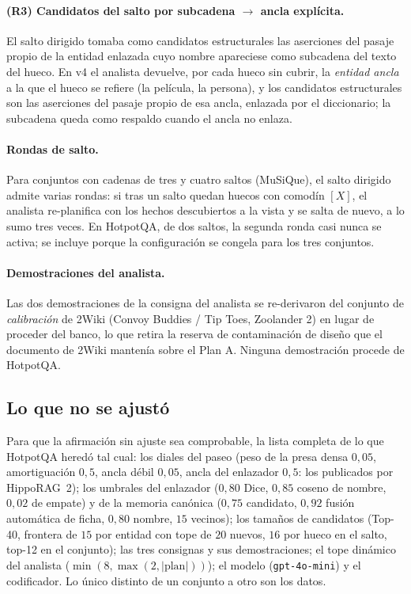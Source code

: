 \documentclass[11pt,a4paper]{article}
\newcommand{\hippo}{HippoRAG~2}
\newcommand{\gl}{\guillemotleft}
\newcommand{\gr}{\guillemotright}
\begin{document}
\paragraph{(R3) Candidatos del salto por subcadena $\to$ ancla explícita.}
El salto dirigido tomaba como candidatos estructurales las aserciones del
pasaje propio de la entidad enlazada cuyo nombre apareciese como subcadena
del texto del hueco. En v4 el analista devuelve, por cada hueco sin cubrir,
la \emph{entidad ancla} a la que el hueco se refiere (la película, la
persona), y los candidatos estructurales son las aserciones del pasaje propio
de esa ancla, enlazada por el diccionario; la subcadena queda como respaldo
cuando el ancla no enlaza.

\paragraph{Rondas de salto.}
Para conjuntos con cadenas de tres y cuatro saltos (MuSiQue), el salto
dirigido admite varias rondas: si tras un salto quedan huecos con comodín
$[X]$, el analista re-planifica con los hechos descubiertos a la vista y se
salta de nuevo, a lo sumo tres veces. En HotpotQA, de dos saltos, la
segunda ronda casi nunca se activa; se incluye porque la configuración se
congela para los tres conjuntos.

\paragraph{Demostraciones del analista.}
Las dos demostraciones de la consigna del analista se re-derivaron del
conjunto de \emph{calibración} de 2Wiki (\gl{}Convoy Buddies / Tip Toes\gr{},
\gl{}Zoolander 2\gr{}) en lugar de proceder del banco, lo que retira la
reserva de contaminación de diseño que el documento de 2Wiki mantenía sobre
el Plan A. Ninguna demostración procede de HotpotQA.

\subsection{Lo que no se ajustó}
\label{sec:congelado}

Para que la afirmación \gl{}sin ajuste\gr{} sea comprobable, la lista
completa de lo que HotpotQA heredó tal cual: los diales del paseo (peso de
la presa densa $0{,}05$, amortiguación $0{,}5$, ancla débil $0{,}05$, ancla
del enlazador $0{,}5$: los publicados por \hippo{}); los umbrales del
enlazador ($0{,}80$ Dice, $0{,}85$ coseno de nombre, $0{,}02$ de empate) y de
la memoria canónica ($0{,}75$ candidato, $0{,}92$ fusión automática de
ficha, $0{,}80$ nombre, $15$ vecinos); los tamaños de candidatos (Top-40,
frontera de $15$ por entidad con tope de $20$ nuevos, $16$ por hueco en el
salto, top-12 en el conjunto); las tres consignas y sus demostraciones; el
tope dinámico del analista ($\min(8,\max(2,|\text{plan}|))$); el modelo
(\texttt{gpt-4o-mini}) y el codificador. Lo único distinto de un conjunto a
otro son los datos.
\end{document}
